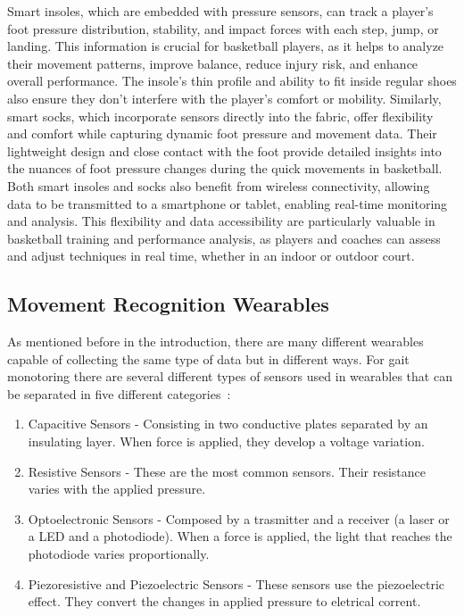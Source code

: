 Smart insoles, which are embedded with pressure sensors, can track a player's foot pressure distribution, stability, and impact forces with each step, jump, or landing. This information 
is crucial for basketball players, as it helps to analyze their movement patterns, improve balance, reduce injury risk, and enhance overall performance. The insole's thin profile and 
ability to fit inside regular shoes also ensure they don't interfere with the player's comfort or mobility.
Similarly, smart socks, which incorporate sensors directly into the fabric, offer flexibility and comfort while capturing dynamic foot pressure and movement data. Their lightweight 
design and close contact with the foot provide detailed insights into the nuances of foot pressure changes during the quick movements in basketball.
Both smart insoles and socks also benefit from wireless connectivity, allowing data to be transmitted to a smartphone or tablet, enabling real-time monitoring and analysis. This 
flexibility and data accessibility are particularly valuable in basketball training and performance analysis, as players and coaches can assess and adjust techniques in real time, 
whether in an indoor or outdoor court.


\subsection{Movement Recognition Wearables}
\label{ssec:movement_recognition_wearables}

As mentioned before in the introduction, there are many different wearables capable of collecting the same type of data but in different ways. %
For gait monotoring there are several different types of sensors used in wearables that can be separated in five different categories~\cite{smartSocks}:


\begin{enumerate}
  \item Capacitive Sensors - Consisting in two conductive plates separated by an insulating layer. When force is applied, they develop a voltage variation.
  \item Resistive Sensors - These are the most common sensors. Their resistance varies with the applied pressure.
  \item Optoelectronic Sensors - Composed by a trasmitter and a receiver (a laser or a LED and a photodiode). When a force is applied, the light that reaches the photodiode varies proportionally.
  \item Piezoresistive and Piezoelectric Sensors - These sensors use the  piezoelectric effect. They convert the changes in applied pressure to eletrical corrent.
\end{enumerate}


